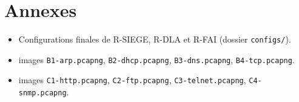 \documentclass[11pt,a4paper]{article}
\begin{document}
	\section{Annexes}

	\begin{itemize}
	\item Configurations finales de R-SIEGE, R-DLA et R-FAI (dossier \texttt{configs/}).
	\item images \texttt{B1-arp.pcapng}, \texttt{B2-dhcp.pcapng}, \texttt{B3-dns.pcapng}, \texttt{B4-tcp.pcapng}.
	\item images \texttt{C1-http.pcapng}, \texttt{C2-ftp.pcapng}, \texttt{C3-telnet.pcapng}, \texttt{C4-snmp.pcapng}.
	\end{itemize}

	
\end{document}
